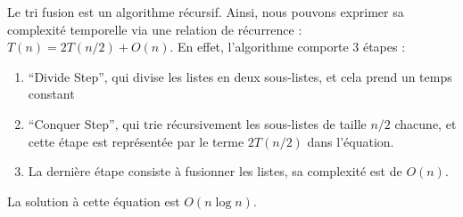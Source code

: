 \begin{Exercice} [30 minutes]
\begin{solution}
        Le tri fusion est un algorithme récursif. Ainsi, nous pouvons exprimer sa complexité temporelle via une relation de récurrence : $T(n) = 2T(n/2) + O(n)$. En effet, l'algorithme comporte 3 étapes :
        \begin{enumerate}
            \item ``Divide Step'', qui divise les listes en deux sous-listes, et cela prend un temps constant
            \item ``Conquer Step'', qui trie récursivement les sous-listes de taille $n/2$ chacune, et cette étape est représentée par le terme $2T(n/2)$ dans l'équation.
            \item La dernière étape consiste à fusionner les listes, sa complexité est de $O(n)$.
        \end{enumerate}
        La solution à cette équation est $O(n \log n)$.
    \end{solution}
\end{Exercice}


